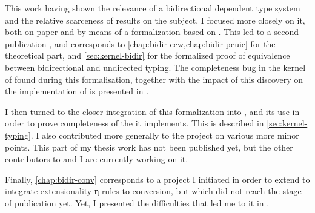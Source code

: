 This work having shown the relevance of a bidirectional dependent type system and the relative
scarceness of results on the subject, I focused more closely on it, both on
paper and by means of a formalization based on . This led to a second publication
, and corresponds to \cref{chap:bidir-ccw,chap:bidir-pcuic}
for the theoretical part, and \cref{sec:kernel-bidir} for the formalized proof
of equivalence between bidirectional and undirected typing.
The completeness bug in the kernel of  found during this formalisation, together with
the impact of this discovery on the implementation of  is presented in
.

I then turned to the closer integration of this formalization into , and its use
in order to prove completeness of the  it implements.%
This is described in \cref{sec:kernel-typing}.
I also contributed more generally to the project on various more minor points.
This part of my thesis work has not been published yet, but the other contributors to
 and I are currently working on it.

Finally, \cref{chap:bidir-conv} corresponds to a project I initiated in order to extend
 to integrate extensionality η rules to conversion,
but which did not reach the stage of publication yet. Yet, I presented the difficulties
that led me to it in .
